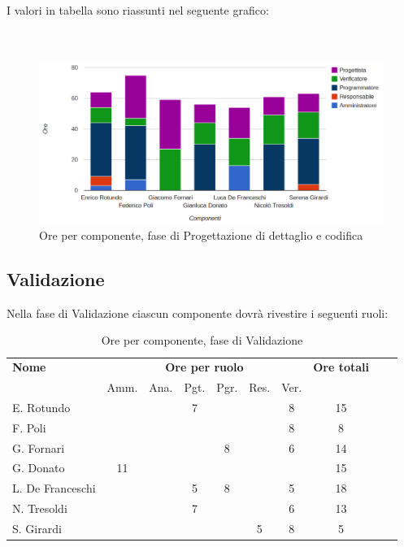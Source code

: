 I valori in tabella sono riassunti nel seguente grafico: \\ \\ \\

\begin{figure}[H]
\centering
\includegraphics[scale=0.35]{4-3.png}
\caption{Ore per componente, fase di Progettazione di dettaglio e codifica \label{fig:nome}}
\end{figure}

\subsection{Validazione}

Nella fase di Validazione ciascun componente dovrà rivestire i seguenti ruoli:

\begin{table}[H]
\centering
\begin{tabular}{lccccccccc}
\toprule 
    \textbf{Nome}  & \multicolumn{6}{c}{\textbf{Ore per ruolo}} & \textbf{Ore totali}\\
    & Amm. & Ana. & Pgt. & Pgr. & Res. & Ver. \\
    \midrule
    E. Rotundo   	&   &  &	 7	&   &   & 8 & 15 \\
    F. Poli  		& 	&  &	 	&   &   & 8 & 8  \\
    G. Fornari		& 	&  &	 	& 8 &   & 6 & 14 \\
    G. Donato 		& 11	&  &	 	&   &   &   & 15 \\
    L. De Franceschi 	& 	&  &	 5	& 8 &   & 5 & 18 \\
    N. Tresoldi 		& 	&  &	 7	&   &   & 6 & 13 \\
    S. Girardi 		& 	&  &	 	&   & 5 & 8 & 5  \\
    
    \bottomrule
\end{tabular}
\caption{Ore per componente, fase di Validazione}
\end{table}

